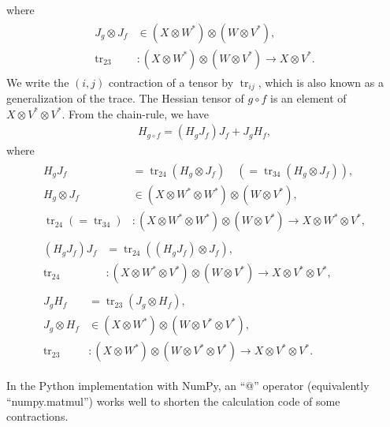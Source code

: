 \documentclass[a4paper]{article}
\newcommand{\jac}{J}
\newcommand{\hes}{H}
\newcommand{\parens}[1]{\left(#1\right)}
\newcommand{\tr}{\mathop{\mathrm{tr}}\nolimits}
\begin{document}
where
\begin{align}
    \begin{aligned}
        \jac_g \otimes \jac_f &\in \parens{X \otimes W^*} \otimes \parens{W \otimes V^*}, \\
        \tr_{23} & : \parens{X \otimes W^*} \otimes \parens{W \otimes V^*} \to
        X \otimes V^*.
    \end{aligned}
\end{align}
We write the $(i, j)$ contraction of a tensor by $\tr_{ij}$,
which is also known as a generalization of the trace.
The Hessian tensor of $g\circ f$ is an element of
$X \otimes V^* \otimes V^*$.
From the chain-rule, we have
\begin{align}
    \hes_{g\circ f} =
    \parens{\hes_g \jac_f} \jac_f +
    \jac_g \hes_f,
\end{align}
where
\begin{align}
    \begin{aligned}
        \hes_g \jac_f & = \tr_{24}\parens{\hes_g \otimes \jac_f}
        \quad\parens{= \tr_{34}\parens{\hes_g \otimes \jac_f}},\\
        \hes_g \otimes \jac_f &\in (X \otimes W^* \otimes W^*) \otimes (W \otimes V^*),\\
        \tr_{24}\parens{= \tr_{34}} &: (X \otimes W^* \otimes W^*) \otimes (W \otimes V^*) \to
        X \otimes W^* \otimes V^*,
    \end{aligned}
    \\[15pt]
    \begin{aligned}
        \parens{\hes_g \jac_f} \jac_f &= \tr_{24}\parens{\parens{\hes_g \jac_f} \otimes \jac_f},\\
        \tr_{24} &: \parens{X \otimes W^* \otimes V^*} \otimes \parens{W \otimes V^*}
        \to X \otimes V^* \otimes V^*,
    \end{aligned}
    \\[15pt]
    \begin{aligned}
        \jac_g \hes_f &= \tr_{23}\parens{\jac_g \otimes \hes_f},\\
        \jac_g \otimes \hes_f &\in (X \otimes W^*) \otimes (W \otimes V^* \otimes V^*),\\
        \tr_{23} &: (X \otimes W^*) \otimes (W \otimes V^* \otimes V^*) \to
        X \otimes V^* \otimes V^*.
    \end{aligned}
\end{align}

In the Python implementation with NumPy, an ``@'' operator (equivalently ``numpy.matmul'') works well
to shorten the calculation code of some contractions.
\end{document}
